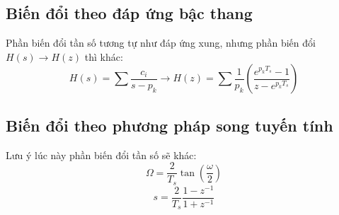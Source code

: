 \documentclass{article}
\begin{document}
\subsection{Biến đổi theo đáp ứng bậc thang}
Phần biến đổi tần số tương tự như đáp ứng xung, nhưng phần biến đổi $H(s)\to H(z)$ thì khác:
$$H(s)=\sum\frac{c_{i}}{s-p_{k}}\to H(z)=\sum\frac{1}{p_{k}}\left(\frac{e^{p_{k}T_{s}}-1}{z-e^{p_{k}T_{s}}}\right)$$
\subsection{Biến đổi theo phương pháp song tuyến tính}
Lưu ý lúc này phần biến đổi tần số sẽ khác:
$$\Omega=\frac{2}{T_{s}}\tan{\left(\frac{\omega}{2}\right)}$$
$$s=\frac{2}{T_{s}}\frac{1-z^{-1}}{1+z^{-1}}$$
\end{document}
